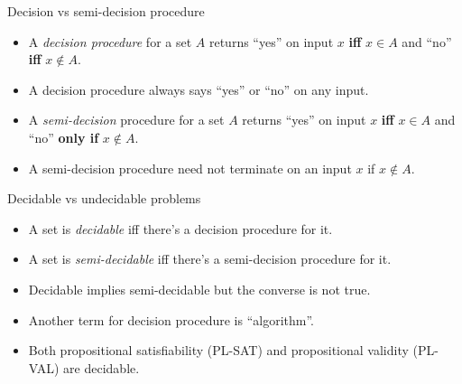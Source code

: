 \documentclass[style=sailor,size=12pt]{powerdot}
\theoremstyle{definition}
\begin{document}
\begin{wideslide}[bm=,toc=]{Decision vs semi-decision procedure}
\begin{itemize}
\item A {\em decision procedure\/} for a set $A$ returns ``yes'' on input $x$ 
{\bf iff} $x\in A$ and ``no'' {\bf iff} $x\not\in A$.
\item A decision procedure always says ``yes'' or ``no'' on any input.
\item A {\em semi-decision\/} procedure for a set $A$ returns ``yes'' on input $x$
{\bf iff} $x\in A$ and ``no'' {\bf only if} $x\not\in A$.
\item A semi-decision procedure need not terminate on an input $x$ if $x\not\in A$.
\end{itemize}
\end{wideslide}


\begin{wideslide}[bm=,toc=]{Decidable vs undecidable problems}
\begin{itemize}
\item A set is {\em decidable\/} iff there's a decision procedure for it.
\item A set is {\em semi-decidable\/} iff there's a semi-decision procedure for it.
\item Decidable implies semi-decidable but the converse is not true.
\item Another term for decision procedure is ``algorithm''.
\item Both propositional satisfiability (PL-SAT) and propositional validity (PL-VAL) are decidable.
\end{itemize}
\end{wideslide}
\end{document}

